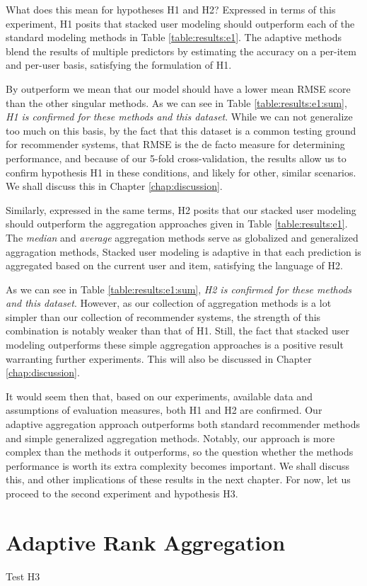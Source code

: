 What does this mean for hypotheses H1 and H2?
Expressed in terms of this experiment,
H1 posits that stacked user modeling should outperform each of the standard modeling methods
in Table \ref{table:results:e1}.
The adaptive methods blend the results of multiple predictors by estimating the accuracy
on a per-item and per-user basis, satisfying the formulation of H1.

By outperform we mean that our model should have a lower
mean RMSE score than the other singular methods. As we can see in Table \ref{table:results:e1:sum},
\emph{H1 is confirmed for these methods and this dataset}.
While we can not generalize too much on this basis, 
by the fact that this dataset is a common testing ground for recommender systems,
that RMSE is the de facto measure for determining performance,
and because of our 5-fold cross-validation, the results allow us 
to confirm hypothesis H1 in these conditions, and likely for other, similar scenarios.
We shall discuss this in Chapter \ref{chap:discussion}.

Similarly, expressed in the same terms, H2 posits that 
our stacked user modeling should outperform the aggregation approaches
given in Table \ref{table:results:e1}.
The \emph{median} and \emph{average} aggregation methods
serve as globalized and generalized aggragation methods,
Stacked user modeling is adaptive in that each prediction is 
aggregated based on the current user and item,
satisfying the language of H2.

As we can see in Table \ref{table:results:e1:sum},
\emph{H2 is confirmed for these methods and this dataset}.
However, as our collection of aggregation methods is a lot simpler
than our collection of recommender systems, the strength of this combination
is notably weaker than that of H1.
Still, the fact that stacked user modeling outperforms these simple aggregation
approaches is a positive result warranting further experiments.
This will also be discussed in Chapter \ref{chap:discussion}.

It would seem then that, based on our experiments, available data
and assumptions of evaluation measures, both H1 and H2 are confirmed.
Our adaptive aggregation approach outperforms both standard recommender
methods and simple generalized aggregation methods.
Notably, our approach is more complex than the methods it outperforms,
so the question whether the methods performance is worth its extra complexity becomes important.
We shall discuss this, and other implications of these results in the next chapter.
For now, let us proceed to the second experiment and hypothesis H3.


\section{Adaptive Rank Aggregation}

Test H3




